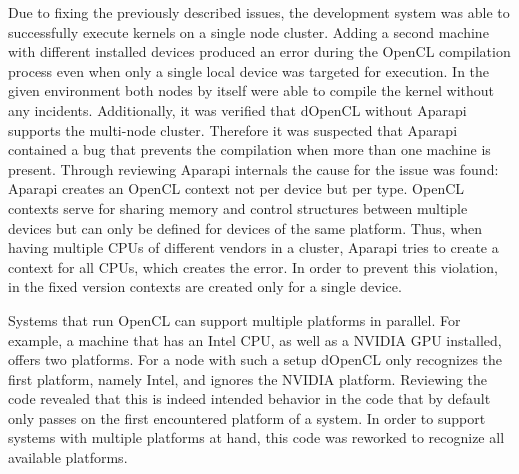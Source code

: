 \begin{description}[style=nextline]
	\item [Failed compilations when using multiple devices]
	Due to fixing the previously described issues, the development system was able to successfully execute kernels on a single node cluster. Adding a second machine with different installed devices produced an error during the OpenCL compilation process even when only a single local device was targeted for execution. In the given environment both nodes by itself were able to compile the kernel without any incidents. Additionally, it was verified that dOpenCL without Aparapi supports the multi-node cluster. Therefore it was suspected that Aparapi contained a bug that prevents the compilation when more than one machine is present. Through reviewing Aparapi internals the cause for the issue was found: Aparapi creates an OpenCL context not per device but per type. OpenCL contexts serve for sharing memory and control structures between multiple devices but can only be defined for devices of the same platform. Thus, when having multiple CPUs of different vendors in a cluster, Aparapi tries to create a context for all CPUs, which creates the error. In order to prevent this violation, in the fixed version contexts are created only for a single device.

	\item [Multiple platforms per machine]
	Systems that run OpenCL can support multiple platforms in parallel. For example, a machine that has an Intel CPU, as well as a NVIDIA GPU installed, offers two platforms. For a node with such a setup dOpenCL only recognizes the first platform, namely Intel, and ignores the NVIDIA platform. Reviewing the code revealed that this is indeed intended behavior in the code that by default only passes on the first encountered platform of a system. In order to support systems with multiple platforms at hand, this code was reworked to recognize all available platforms.

\end{description}


